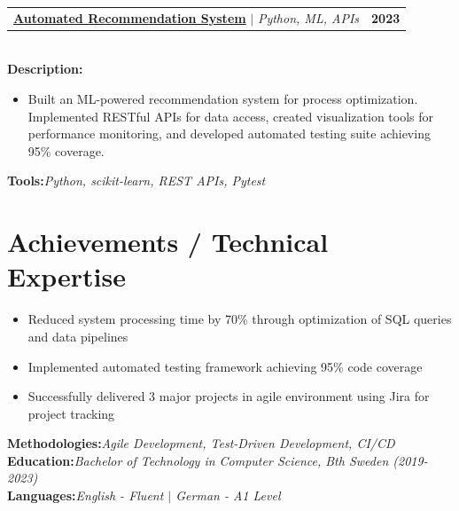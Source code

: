 \documentclass[letterpaper,11pt]{article}
\makeatletter
\newcommand{\resumeItem}[1]{
  \item\small{
    {#1 \vspace{-2pt}}
  }
}
\newcommand{\resumeProjectHeading}[2]{
    \item
    \begin{tabular*}{1.001\textwidth}{l@{\extracolsep{\fill}}r}
      \small#1 & \textbf{\small #2}\\
    \end{tabular*}\vspace{-7pt}
}
\newcommand{\resumeSubHeadingListStart}{\begin{itemize}[leftmargin=0.0in, label={}]}
\newcommand{\resumeSubHeadingListEnd}{\end{itemize}}
\newcommand{\resumeItemListStart}{\begin{itemize}}
\newcommand{\resumeItemListEnd}{\end{itemize}\vspace{-5pt}}
\makeatother
\begin{document}
\resumeProjectHeading
{\href{https://yakkshit.com}{\textbf{Automated Recommendation System}} $|$ \emph{Python, ML, APIs}}{2023}\\
\vspace{6pt}
\textbf{Description:}
\vspace{-5pt}
\resumeItemListStart
\resumeItem{Built an ML-powered recommendation system for process optimization. Implemented RESTful APIs for data access, created visualization tools for performance monitoring, and developed automated testing suite achieving 95\% coverage.}
\resumeItemListEnd
\vspace{4pt}
\textbf{Tools:}\emph{Python, scikit-learn, REST APIs, Pytest}
\vspace{-12pt}

\section{Achievements / Technical Expertise}
\resumeSubHeadingListStart
\resumeItemListStart
\resumeItem{Reduced system processing time by 70\% through optimization of SQL queries and data pipelines}
\resumeItem{Implemented automated testing framework achieving 95\% code coverage}
\resumeItem{Successfully delivered 3 major projects in agile environment using Jira for project tracking}
\resumeItemListEnd

\resumeSubHeadingListEnd
\textbf{Methodologies:}\emph{Agile Development, Test-Driven Development, CI/CD} \\
\textbf{Education:}\emph{Bachelor of Technology in Computer Science, Bth Sweden (2019-2023)} \\
\textbf{Languages:}\emph{English - Fluent $|$ German - A1 Level}

\vspace{10pt}
\end{document}
